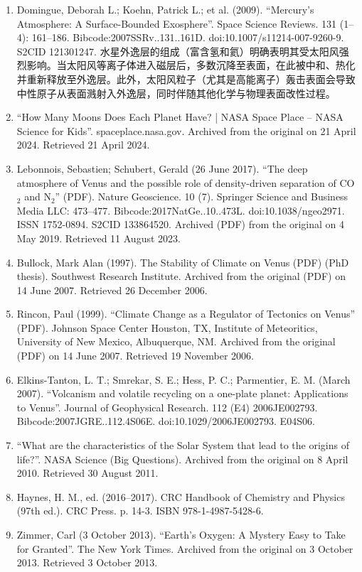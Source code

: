 \begin{enumerate}
\item Domingue, Deborah L.; Koehn, Patrick L.; et al. (2009). ``Mercury's Atmosphere: A Surface-Bounded Exosphere''. Space Science Reviews. 131 (1–4): 161–186. Bibcode:2007SSRv..131..161D. doi:10.1007/s11214-007-9260-9. S2CID 121301247.  
水星外逸层的组成（富含氢和氦）明确表明其受太阳风强烈影响。当太阳风等离子体进入磁层后，多数沉降至表面，在此被中和、热化并重新释放至外逸层。此外，太阳风粒子（尤其是高能离子）轰击表面会导致中性原子从表面溅射入外逸层，同时伴随其他化学与物理表面改性过程。
\item ``How Many Moons Does Each Planet Have? | NASA Space Place – NASA Science for Kids''. spaceplace.nasa.gov. Archived from the original on 21 April 2024. Retrieved 21 April 2024.
\item Lebonnois, Sebastien; Schubert, Gerald (26 June 2017). ``The deep atmosphere of Venus and the possible role of density-driven separation of CO$_2$ and N$_2$'' (PDF). Nature Geoscience. 10 (7). Springer Science and Business Media LLC: 473–477. Bibcode:2017NatGe..10..473L. doi:10.1038/ngeo2971. ISSN 1752-0894. S2CID 133864520. Archived (PDF) from the original on 4 May 2019. Retrieved 11 August 2023.
\item Bullock, Mark Alan (1997). The Stability of Climate on Venus (PDF) (PhD thesis). Southwest Research Institute. Archived from the original (PDF) on 14 June 2007. Retrieved 26 December 2006.
\item Rincon, Paul (1999). ``Climate Change as a Regulator of Tectonics on Venus'' (PDF). Johnson Space Center Houston, TX, Institute of Meteoritics, University of New Mexico, Albuquerque, NM. Archived from the original (PDF) on 14 June 2007. Retrieved 19 November 2006.
\item Elkins-Tanton, L. T.; Smrekar, S. E.; Hess, P. C.; Parmentier, E. M. (March 2007). ``Volcanism and volatile recycling on a one-plate planet: Applications to Venus''. Journal of Geophysical Research. 112 (E4) 2006JE002793. Bibcode:2007JGRE..112.4S06E. doi:10.1029/2006JE002793. E04S06.
\item ``What are the characteristics of the Solar System that lead to the origins of life?''. NASA Science (Big Questions). Archived from the original on 8 April 2010. Retrieved 30 August 2011.
\item Haynes, H. M., ed. (2016–2017). CRC Handbook of Chemistry and Physics (97th ed.). CRC Press. p. 14-3. ISBN 978-1-4987-5428-6.
\item Zimmer, Carl (3 October 2013). ``Earth's Oxygen: A Mystery Easy to Take for Granted''. The New York Times. Archived from the original on 3 October 2013. Retrieved 3 October 2013.

\end{enumerate}
